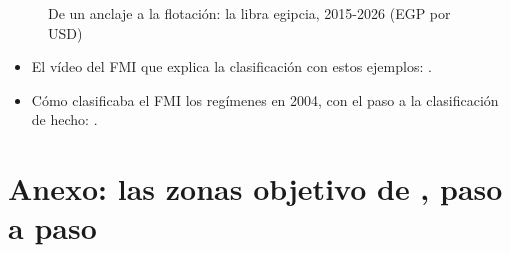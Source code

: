 \documentclass[11pt]{article}
\begin{document}
\begin{figure}[H]
\centering
\caption{De un anclaje a la flotación: la libra egipcia, 2015-2026 (EGP por USD)}\label{fig:libra-egipcia}
\end{figure}

\begin{anotaciones}
\begin{itemize}
\item El vídeo del FMI que explica la clasificación con estos ejemplos: \textcite{FMIInstitute2021Clasificacion}.
\item Cómo clasificaba el FMI los regímenes en 2004, con el paso a la clasificación de hecho: \textcite{FMI2004Clasificacion}.
\end{itemize}
\end{anotaciones}

\section{Anexo: las zonas objetivo de , paso a paso}\label{anexo:krugman}
\end{document}
